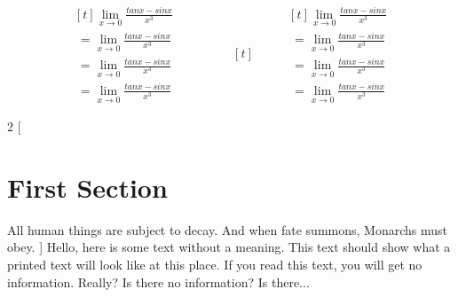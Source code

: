 \documentclass[14pt]{extarticle}
\begin{document}
\begin{equation*}
\begin{aligned}[t]
\lim_{x \to 0} \frac{tan x - sin x}{x^3} \\
\ =\lim_{x \to 0} \frac{tan x - sin x}{x^3}\\ 
\ =\lim_{x \to 0} \frac{tan x - sin x}{x^3} \\
\ =\lim_{x \to 0} \frac{tan x - sin x}{x^3} 
\end{aligned}
\qquad 
\qquad
\begin{aligned}[t]
\end{aligned}
\qquad
\begin{aligned}[t]
\lim_{x \to 0} \frac{tan x - sin x}{x^3} \\
\ =\lim_{x \to 0} \frac{tan x - sin x}{x^3}\\ 
\ =\lim_{x \to 0} \frac{tan x - sin x}{x^3} \\
\ =\lim_{x \to 0} \frac{tan x - sin x}{x^3} 
\end{aligned}
\end{equation*}

\begin{multicols}{2}
[
\section{First Section}
All human things are subject to decay. And when fate summons, Monarchs must obey.
]
Hello, here is some text without a meaning.  This text should show what 
a printed text will look like at this place.
If you read this text, you will get no information.  Really?  Is there 
no information?  Is there...
\end{multicols}
\end{document}
